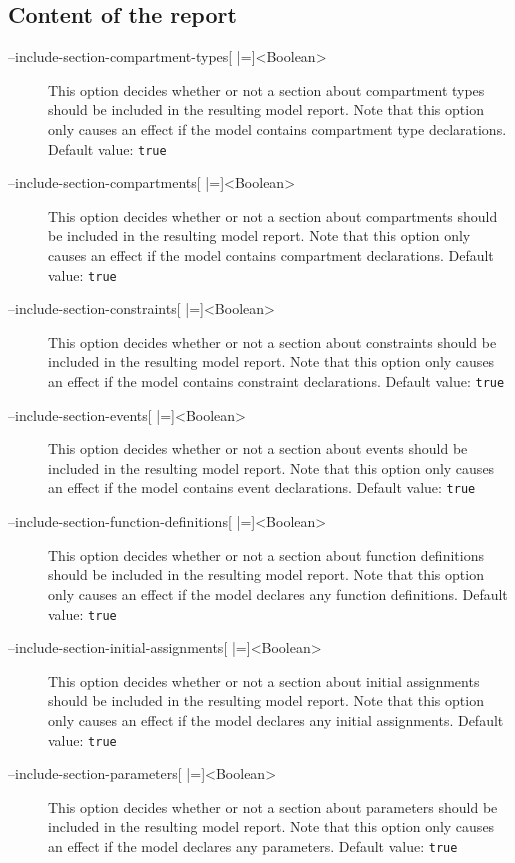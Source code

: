 \subsection{Content of the report}
\begin{description}
\item[--include-section-compartment-types{[} |={]}<Boolean>]
  This option decides whether or not a section about compartment
  types should be included in the resulting model report. Note
  that this option only causes an effect if the model contains
  compartment type declarations.
  Default value: \texttt{true}

\item[--include-section-compartments{[} |={]}<Boolean>]
  This option decides whether or not a section about compartments
  should be included in the resulting model report. Note that
  this option only causes an effect if the model contains compartment
  declarations.
  Default value: \texttt{true}

\item[--include-section-constraints{[} |={]}<Boolean>]
  This option decides whether or not a section about constraints
  should be included in the resulting model report. Note that
  this option only causes an effect if the model contains constraint
  declarations.
  Default value: \texttt{true}

\item[--include-section-events{[} |={]}<Boolean>]
  This option decides whether or not a section about events should
  be included in the resulting model report. Note that this option
  only causes an effect if the model contains event declarations.
  Default value: \texttt{true}

\item[--include-section-function-definitions{[} |={]}<Boolean>]
  This option decides whether or not a section about function definitions
  should be included in the resulting model report. Note that
  this option only causes an effect if the model declares any
  function definitions.
  Default value: \texttt{true}

\item[--include-section-initial-assignments{[} |={]}<Boolean>]
  This option decides whether or not a section about initial assignments
  should be included in the resulting model report. Note that
  this option only causes an effect if the model declares any
  initial assignments.
  Default value: \texttt{true}

\item[--include-section-parameters{[} |={]}<Boolean>]
  This option decides whether or not a section about parameters
  should be included in the resulting model report. Note that
  this option only causes an effect if the model declares any
  parameters.
  Default value: \texttt{true}


\end{description}
